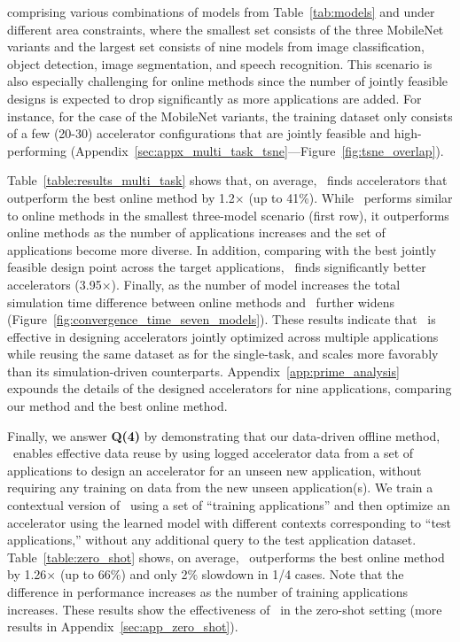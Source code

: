 %
%
comprising various combinations of models from Table~\ref{tab:models} and under different area constraints, where the smallest set consists of the three MobileNet variants and the largest set consists of nine models from image classification, object detection, image segmentation, and speech recognition.
%
This scenario is also especially challenging for online methods since the number of jointly feasible designs is expected to drop significantly as more applications are added.
%
For instance, for the case of the MobileNet variants, the training dataset only consists of a few (20-30) accelerator configurations that are jointly feasible and high-performing (Appendix~\ref{sec:appx_multi_task_tsne}---Figure~\ref{fig:tsne_overlap}). 

Table~\ref{table:results_multi_task} shows that, on average, \primemethodname\ finds accelerators that outperform the best online method by 1.2$\times$ (up to 41\%).
%
While \primemethodname\ performs similar to online methods in the smallest three-model scenario (first row), it outperforms online methods as the number of applications increases and the set of applications become more diverse.
%
In addition, comparing with the best jointly feasible design point across the target applications, \primemethodname\ finds significantly better accelerators (3.95$\times$).
%
Finally, as the number of model increases the total simulation time difference between online methods and \primemethodname\ further widens (Figure~\ref{fig:convergence_time_seven_models}).
%
These results indicate that \primemethodname\ is effective in designing accelerators jointly optimized across multiple applications while reusing the same dataset as for the single-task, and scales more favorably than its simulation-driven counterparts.
%
Appendix~\ref{app:prime_analysis} expounds the details of the designed accelerators for nine applications, comparing our method and the best online method.


%
Finally, we answer \textbf{Q(4)} by demonstrating that our data-driven offline method, \primemethodname\ enables effective data reuse by using logged accelerator data from a set of applications to design an accelerator for an unseen new application, without requiring any training on data from the new unseen application(s).
%
We train a contextual version of \primemethodname\ using a set of ``training applications'' and then optimize an accelerator using the learned model with different contexts corresponding to ``test applications,'' without any additional query to the test application dataset.
%
Table~\ref{table:zero_shot} shows, on average, \primemethodname\ outperforms the best online method by 1.26$\times$ (up to 66$\%$) and only 2$\%$ slowdown in 1/4 cases.
%
Note that the difference in performance increases as the number of training applications increases.
%
These results show the effectiveness of \primemethodname\ in the zero-shot setting (more results in Appendix~\ref{sec:app_zero_shot}).

